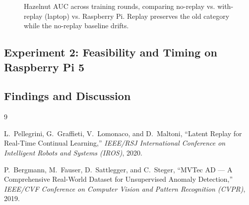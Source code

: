 \documentclass[11pt]{article}
\begin{document}
\begin{figure}[H]
\centering
\caption{Hazelnut AUC across training rounds, comparing no-replay vs.
with-replay (laptop) vs. Raspberry Pi. Replay preserves the old category while
the no-replay baseline drifts.}
\label{fig:hazelnut}
\end{figure}

\subsection{Experiment 2: Feasibility and Timing on Raspberry Pi 5}

\subsection{Findings and Discussion}


\begin{thebibliography}{9}

L.~Pellegrini, G.~Graffieti, V.~Lomonaco, and D.~Maltoni,
``Latent Replay for Real-Time Continual Learning,''
\textit{IEEE/RSJ International Conference on Intelligent Robots and Systems (IROS)}, 2020.

P.~Bergmann, M.~Fauser, D.~Sattlegger, and C.~Steger,
``MVTec AD --- A Comprehensive Real-World Dataset for Unsupervised Anomaly Detection,''
\textit{IEEE/CVF Conference on Computer Vision and Pattern Recognition (CVPR)}, 2019.

\end{thebibliography}
\end{document}
